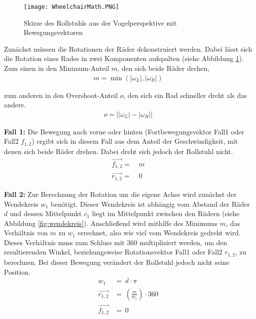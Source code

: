 \begin{figure}[h]
    \centering
    \texttt{[image: WheelchairMath.PNG]}
    \caption{Skizze des Rollstuhls aus der Vogelperspektive mit Bewegungsvektoren}
    \label{fig:wheelchairMath}
\end{figure}

Zunächst müssen die Rotationen der Räder dekonstruiert werden.
Dabei lässt sich die Rotation eines Rades in zwei Komponenten aufspalten (siehe Abbildung \ref{fig:wheelchairMath}).
Zum einen in den Minimum-Anteil $m$, den sich beide Räder drehen,
\begin{align}
    m = \min{(\left| \omega_L \right|,\left| \omega_R\right|)}
\end{align}

zum anderen in den Overshoot-Anteil $o$, den sich ein Rad schneller dreht als das andere.
\begin{align}
    o = \left|\left| \omega_L \right|-\left| \omega_R\right| \right|
\end{align}

\textbf{Fall 1:}
Die Bewegung nach vorne oder hinten (Fortbewegungsvektor Fall1 oder Fall2 $f_{1,2}$) ergibt sich in diesem Fall aus dem Anteil der Geschwindigkeit, mit denen sich beide Räder drehen.
Dabei dreht sich jedoch der Rollstuhl nicht.
\begin{align}
    \vec{f_{1,2}} = & \ m \\
    \vec{r_{1,2}} = & \ 0
\end{align}

\textbf{Fall 2:}
Zur Berechnung der Rotation um die eigene Achse wird zunächst der Wendekreis $w_1$ benötigt.
Dieser Wendekreis ist abhängig vom Abstand der Räder $d$ und dessen Mittelpunkt $c_1$ liegt im Mittelpunkt zwischen den Rädern (siehe Abbildung \ref{fig:wendekreis}).
Anschließend wird mithilfe des Minimums $m$, das Verhältnis von $m$ zu $w_1$ errechnet, also wie viel vom Wendekreis gedreht wird.
Dieses Verhältnis muss zum Schluss mit $360$ multipliziert werden, um den resultierenden Winkel, beziehungsweise Rotationsvektor Fall1 oder Fall2 $r_{1,2}$, zu berechnen.
Bei dieser Bewegung verändert der Rollstuhl jedoch nicht seine Position.
\begin{align}
    w_1           & =            \ d \cdot \pi                  \\
    \vec{r_{1,2}} & =  \ \left(\frac {m} {w_1}\right) \cdot 360 \\
    \vec{f_{1,2}} & =  \ 0
\end{align}

